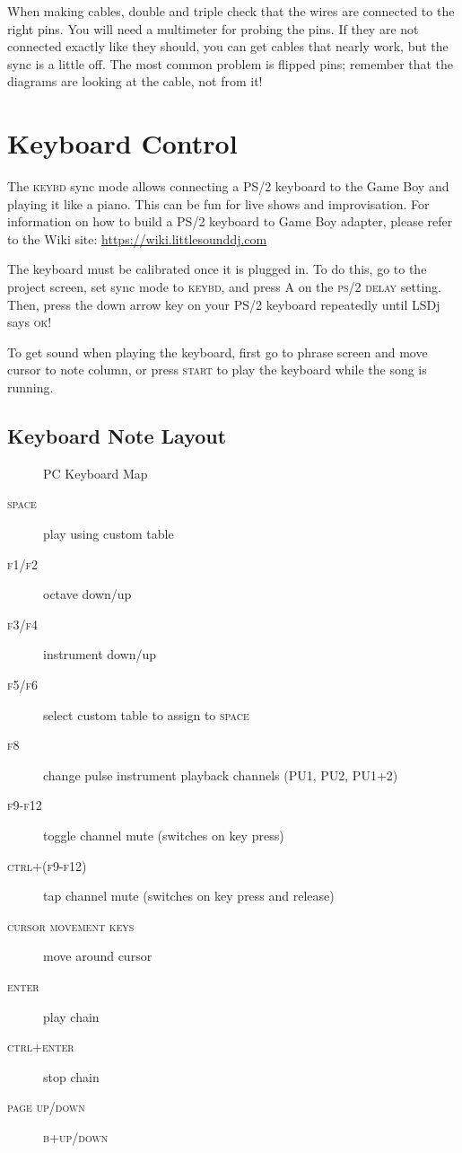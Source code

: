 When making cables, double and triple check that the wires are connected to the right pins. You will need a multimeter for probing the pins. If they are not connected exactly like they should, you can get cables that nearly work, but the sync is a little off. The most common problem is flipped pins; remember that the diagrams are looking at the cable, not from it!

\section{Keyboard Control}

The \textsc{keybd} sync mode allows connecting a PS/2 keyboard to the Game Boy and playing it like a piano. This can be fun for live shows and improvisation. For information on how to build a PS/2 keyboard to Game Boy adapter, please refer to the Wiki site: \url{https://wiki.littlesounddj.com}

The keyboard must be calibrated once it is plugged in. To do this, go to the project screen, set sync mode to \textsc{keybd}, and press \textsc{A} on the \textsc{ps/2 delay} setting. Then, press the down arrow key on your PS/2 keyboard repeatedly until LSDj says \textsc{ok!}

To get sound when playing the keyboard, first go to phrase screen and move cursor to note column, or press \textsc{start} to play the keyboard while the song is running.

\subsection{Keyboard Note Layout}

\begin{figure}[htpb]
	\begin{center}
	\end{center}
	\caption{PC Keyboard Map}
	\label{fig:keybd-map}
\end{figure}

\begin{description}
\item[\textsc{space}] play using custom table
\item[\textsc{f1/f2}] octave down/up
\item[\textsc{f3/f4}] instrument down/up
\item[\textsc{f5/f6}] select custom table to assign to \textsc{space}
\item[\textsc{f8}] change pulse instrument playback channels (\textsc{PU1, PU2, PU1+2})
\item[\textsc{f9-f12}] toggle channel mute (switches on key press)
\item[\textsc{ctrl+(f9-f12)}] tap channel mute (switches on key press and release)
\item[\textsc{cursor movement keys}] move around cursor
\item[\textsc{enter}] play chain
\item[\textsc{ctrl+enter}] stop chain
\item[\textsc{page up/down}] \textsc{b+up/down}
\end{description}

